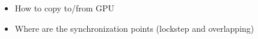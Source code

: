 \documentclass{report}
\begin{document}
\begin{itemize} 
\item How to copy to/from GPU
\item Where are the synchronization points (lockstep and overlapping)
\end{itemize}



%
%
%
\end{document}
